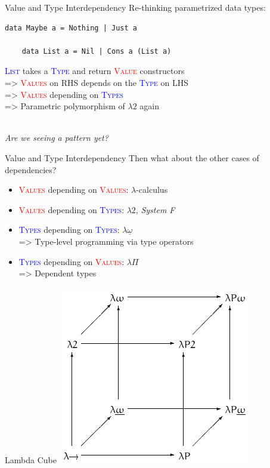 \documentclass[xcolor={usenames,dvipsnames}]{beamer}
\newcommand{\htycon}[1]{\textcolor{Blue}{\textsc{#1}}}
\newcommand{\hvalcon}[1]{\textcolor{Red}{\textsc{#1}}}
\begin{document}
\begin{frame}[fragile]{Value and Type Interdependency}
  Re-thinking parametrized data types:
  \begin{lstlisting}[style=hask]
    data Maybe a = Nothing | Just a

    data List a = Nil | Cons a (List a)
  \end{lstlisting}

  \pause
  \qquad \htycon{List} takes a \htycon{Type} and return \hvalcon{Value} constructors
  \ \\
  \pause
  => \hvalcon{Values} on RHS depends on the \htycon{Type} on LHS
  \ \\
  \pause
  => \hvalcon{Values} depending on \htycon{Types}
  \ \\
  \pause
  => Parametric polymorphism of $\lambda2$ again

  \ \\
  \pause
  \textit{\tiny{Are we seeing a pattern yet?}}
\end{frame}

\begin{frame}[fragile]{Value and Type Interdependency}
  Then what about the other cases of dependencies?
  \pause
  \begin{itemize}
    \item \hvalcon{Values} depending on \hvalcon{Values}: $\lambda$-calculus
    \pause
    \item \hvalcon{Values} depending on \htycon{Types}: $\lambda2$, \textit{System F}
    \pause
    \item \htycon{Types} depending on \htycon{Types}: \pause$\lambda\underline\omega$\\
      => Type-level programming via type operators
    \pause
    \item \htycon{Types} depending on \hvalcon{Values}: \pause$\lambda\Pi$\\
      => Dependent types
  \end{itemize}
\end{frame}

\begin{frame}[fragile]{Lambda Cube}
  \includegraphics[scale=0.6]{Lambda_cube.png}
\end{frame}
\end{document}
